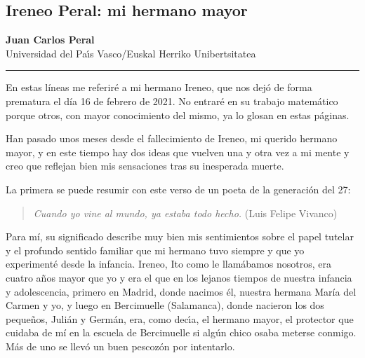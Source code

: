%
%
%
%


\subsection{Ireneo Peral: mi hermano mayor}

\begin{center}\large
\textbf{Juan Carlos Peral}\\[1em] 
Universidad del Pa\'{\i}s Vasco/Euskal Herriko Unibertsitatea
{\color{azulsema}\rule{.5\linewidth}{1pt}}
\end{center}

\vskip 5mm



En estas l\'ineas me referir\' e a mi hermano Ireneo, que nos  dej\'o  de forma prematura el d\'ia 16 de febrero de 2021.
No entrar\'e en su   trabajo matem\'atico porque otros, con mayor conocimiento del mismo, ya lo glosan en estas p\'aginas.



 Han pasado unos meses desde el fallecimiento de Ireneo, mi querido hermano mayor, y en este tiempo hay dos ideas que vuelven una y otra vez a mi mente y creo que reflejan bien mis sensaciones tras su inesperada muerte.
 
La primera se puede resumir con este verso de un poeta de la generaci\'on del 27:

\begin{quote}
\textit{Cuando yo vine al mundo, ya estaba todo hecho.} (Luis Felipe Vivanco)
\end{quote}

Para m\'i, su significado describe muy bien mis sentimientos sobre el papel tutelar y el profundo sentido familiar  que mi hermano tuvo siempre y que yo experiment\'e desde la infancia. Ireneo, Ito como le llam\'abamos nosotros, era cuatro a\~nos mayor que yo y era el que en los lejanos tiempos de nuestra infancia y adolescencia, primero en Madrid,  donde nacimos \'el, nuestra hermana Mar\'ia del Carmen y yo,  y luego en Bercimuelle (Salamanca), donde nacieron los dos  peque\~nos, Juli\'an y Germ\'an, era, como dec\'{\i}a,  el hermano mayor, el protector que cuidaba de m\'i en la escuela de Bercimuelle si alg\'un chico osaba meterse conmigo. M\'as de uno se llev\'o un buen pescoz\'on por intentarlo.


